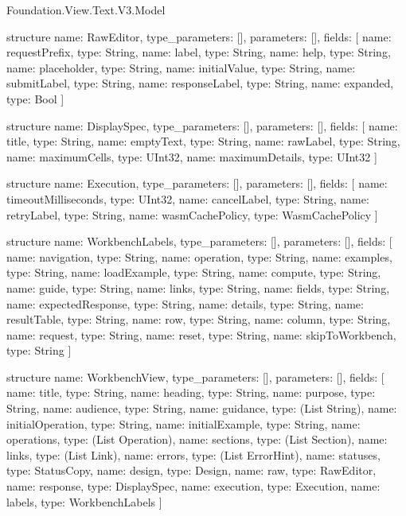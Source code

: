 \begin{lexlean}{Foundation.View.Text.V3.Model}
\begin{semanticmodule}
structure{
  name: RawEditor,
  type_parameters: [],
  parameters: [],
  fields: [
    {name: requestPrefix, type: String},
    {name: label, type: String},
    {name: help, type: String},
    {name: placeholder, type: String},
    {name: initialValue, type: String},
    {name: submitLabel, type: String},
    {name: responseLabel, type: String},
    {name: expanded, type: Bool}
  ]
}

structure{
  name: DisplaySpec,
  type_parameters: [],
  parameters: [],
  fields: [
    {name: title, type: String},
    {name: emptyText, type: String},
    {name: rawLabel, type: String},
    {name: maximumCells, type: UInt32},
    {name: maximumDetails, type: UInt32}
  ]
}

structure{
  name: Execution,
  type_parameters: [],
  parameters: [],
  fields: [
    {name: timeoutMilliseconds, type: UInt32},
    {name: cancelLabel, type: String},
    {name: retryLabel, type: String},
    {name: wasmCachePolicy, type: WasmCachePolicy}
  ]
}

structure{
  name: WorkbenchLabels,
  type_parameters: [],
  parameters: [],
  fields: [
    {name: navigation, type: String},
    {name: operation, type: String},
    {name: examples, type: String},
    {name: loadExample, type: String},
    {name: compute, type: String},
    {name: guide, type: String},
    {name: links, type: String},
    {name: fields, type: String},
    {name: expectedResponse, type: String},
    {name: details, type: String},
    {name: resultTable, type: String},
    {name: row, type: String},
    {name: column, type: String},
    {name: request, type: String},
    {name: reset, type: String},
    {name: skipToWorkbench, type: String}
  ]
}

structure{
  name: WorkbenchView,
  type_parameters: [],
  parameters: [],
  fields: [
    {name: title, type: String},
    {name: heading, type: String},
    {name: purpose, type: String},
    {name: audience, type: String},
    {name: guidance, type: (List String)},
    {name: initialOperation, type: String},
    {name: initialExample, type: String},
    {name: operations, type: (List Operation)},
    {name: sections, type: (List Section)},
    {name: links, type: (List Link)},
    {name: errors, type: (List ErrorHint)},
    {name: statuses, type: StatusCopy},
    {name: design, type: Design},
    {name: raw, type: RawEditor},
    {name: response, type: DisplaySpec},
    {name: execution, type: Execution},
    {name: labels, type: WorkbenchLabels}
  ]
}


\end{semanticmodule}
\end{lexlean}

